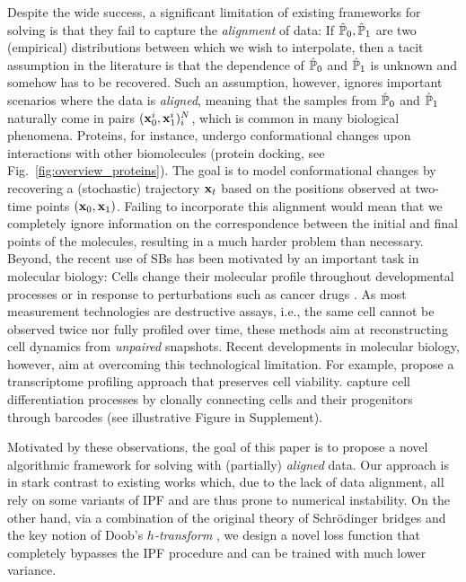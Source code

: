 Despite the wide success, a significant limitation of existing frameworks for solving  is that they fail to capture the \emph{alignment} of data: If $\hat{\mathbb{P}}_{ {0} }, \hat{\mathbb{P}}_{ {1}}$ are two (empirical) distributions between which we wish to interpolate, then a tacit assumption in the literature is that the dependence of $\hat{\mathbb{P}}_{ {0} }$ and $\hat{\mathbb{P}}_{ {1}}$ is unknown and somehow has to be recovered. Such an assumption, however, ignores important scenarios where the data is \emph{aligned}, meaning that the samples from $\hat{\mathbb{P}}_{ {0} }$ and $\hat{\mathbb{P}}_{ {1}}$ naturally come in pairs $(\mathbf{x}^i_0,\mathbf{x}^i_1)_i^{N}$, which is common in many biological phenomena. Proteins, for instance, undergo conformational changes upon interactions with other biomolecules (protein docking, see Fig.~\ref{fig:overview_proteins}). The goal is to model conformational changes by recovering a (stochastic) trajectory $\mathbf{x}_t$ based on the positions observed at two-time points $\left(\mathbf{x}_0, \mathbf{x}_1\right)$. Failing to incorporate this alignment would mean that we completely ignore information on the correspondence between the initial and final points of the molecules, resulting in a much harder problem than necessary.
Beyond, the recent use of SBs has been motivated by an important task in molecular biology: Cells change their molecular profile throughout developmental processes \citep{schiebinger2019optimal,bunne2022proximal} or in response to perturbations such as cancer drugs \citep{lotfollahi2019scgen,bunne2021learning}. As most measurement technologies are destructive assays, i.e., the same cell cannot be observed twice nor fully profiled over time, these methods aim at reconstructing cell dynamics from \emph{unpaired} snapshots.
Recent developments in molecular biology, however, aim at overcoming this technological limitation. For example, \citet{chen2022live} propose a transcriptome profiling approach that preserves cell viability. \citet{weinreb2020lineage} capture cell differentiation processes by clonally connecting cells and their progenitors through barcodes (see illustrative Figure in Supplement).

 Motivated by these observations, the goal of this paper is to propose a novel algorithmic framework for solving  with (partially) \emph{aligned} data. Our approach is in stark contrast to existing works which, due to the lack of data alignment, all rely on some variants of \acrshort{IPF} \citep{fortet1940resolution, kullback1968probability} and are thus prone to numerical instability. On the other hand, via a combination of the original theory of Schr\"odinger bridges \citep{schrodinger1931umkehrung,leonard2013survey} and the key notion of Doob's \emph{$h$-transform} \citep{doob1984classical, rogers2000diffusions}, we design a novel loss function that completely bypasses the \acrshort{IPF} procedure and can be trained with much lower variance.


